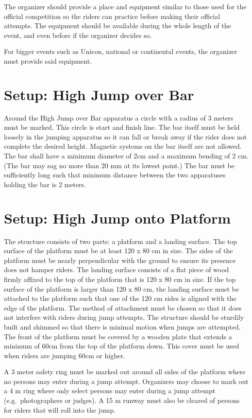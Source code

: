 The organizer should provide a place and equipment similar to those used for the official competition so the riders can practice before making their official attempts.
The equipment should be available during the whole length of the event, and even before if the organizer decides so.

For bigger events such as Unicon, national or continental events, the organizer must provide said equipment.

\section{Setup: High Jump over Bar}
Around the High Jump over Bar apparatus a circle with a radius of 3 meters must be marked.
This circle is start and finish line.
The bar itself must be held loosely in the jumping apparatus so it can fall or break away if the rider does not complete the desired height.
Magnetic systems on the bar itself are not allowed.
The bar shall have a minimum diameter of 2cm and a maximum bending of 2 cm.
(The bar may sag no more than 20 mm at its lowest point.)
The bar must be sufficiently long such that minimum distance between the two apparatuses holding the bar is 2 meters.

\section{Setup: High Jump onto Platform}
The structure consists of two parts: a platform and a landing surface.
The top surface of the platform must be at least 120 x 80 cm in size.
The sides of the platform must be nearly perpendicular with the ground to ensure its presence does not hamper riders.
The landing surface consists of a flat piece of wood firmly affixed to the top of the platform that is 120 x 80 cm in size.
If the top surface of the platform is larger than 120 x 80 cm, the landing surface must be attached to the platform such that one of the 120 cm sides is aligned with the edge of the platform.
The method of attachment must be chosen so that it does not interfere with riders during jump attempts.
The structure should be sturdily built and shimmed so that there is minimal motion when jumps are attempted.
The front of the platform must be covered by a wooden plate that extends a minimum of 60cm from the top of the platform down.
This cover must be used when riders are jumping 60cm or higher.

A 3 meter safety ring must be marked out around all sides of the platform where no persons may enter during a jump attempt.
Organizers may choose to mark out a 4 m ring where only select persons may enter during a jump attempt (e.g.\ photographers or judges).
A 15 m runway must also be cleared of persons for riders that will roll into the jump.

